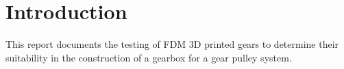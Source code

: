 \section{Introduction}
\label{sec:introduction}

This report documents the testing of FDM 3D printed gears to determine their suitability in the construction of a gearbox for a gear pulley system.
